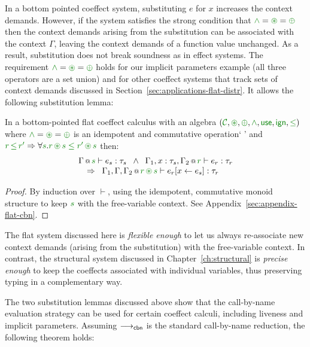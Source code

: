 In a bottom pointed coeffect system, substituting $e$ for $x$ increases the context
demands. However, if the system satisfies the strong condition that $\czip = \cseq = \cpar$
then the context demands arising from the substitution can be associated with the context
$\Gamma$, leaving the context demands of a function value unchanged. As a result, substitution
does not break soundness as in effect systems. The requirement $\czip = \cseq = \cpar$ holds for
our implicit parameters example (all three operators are a set union) and for other coeffect
systems that track sets of context demands discussed in Section~\ref{sec:applications-flat-distr}.
It allows the following substitution lemma:

\begin{lemma}
\label{thm:cbn-substitution-bot}
In a bottom-pointed flat coeffect calculus with an algebra $(\C, \cseq, \cpar, \czip, \cunit, \czero, \cleq)$
where $\czip = \cseq = \cpar$ is an idempotent and commutative operation`  ' and
$\cclrd{r}\,\cleq\,\cclrd{r'} \Rightarrow \forall\cclrd{s}.\cclrd{r}\,\cseq\,\cclrd{s}\;\cleq\;\cclrd{r'}\,\cseq\,\cclrd{s}$ then:
%
\begin{equation*}
\begin{array}{l}
\coctx{\Gamma}{\cclrd{s}} \vdash e_s : \tau_s \;\; \wedge \;\;
\coctx{\Gamma_1,  x : \tau_s, \Gamma_2}{ \cclrd{r}  } \vdash e_r : \tau_r\\
\quad \Rightarrow \;\; \coctx{\Gamma_1,\Gamma,\Gamma_2}{ \cclrd{r} \,\cseq\, \cclrd{s} } \vdash \subst{e_r}{x}{e_s} : \tau_r
\end{array}
\end{equation*}

\end{lemma}
\begin{proof}
By induction over $\vdash$, using the idempotent, commutative monoid structure to keep $\cclrd{s}$ with
the free-variable context. See Appendix~\ref{sec:appendix-flat-cbn}.
\end{proof}

\noindent
The flat system discussed here is \emph{flexible enough} to let us always re-associate new context
demands (arising from the substitution) with the free-vari\-able context. In contrast, the
structural system discussed in Chapter~\ref{ch:structural} is \emph{precise enough} to keep the
coeffects associated with individual variables, thus preserving typing in a complementary way.

The two substitution lemmas discussed above show that the call-by-name evaluation strategy can be
used for certain coeffect calculi, including liveness and implicit parameters. Assuming
$\longrightarrow_{\textnormal{\sffamily cbn}}$ is the standard call-by-name reduction, the following theorem holds:

